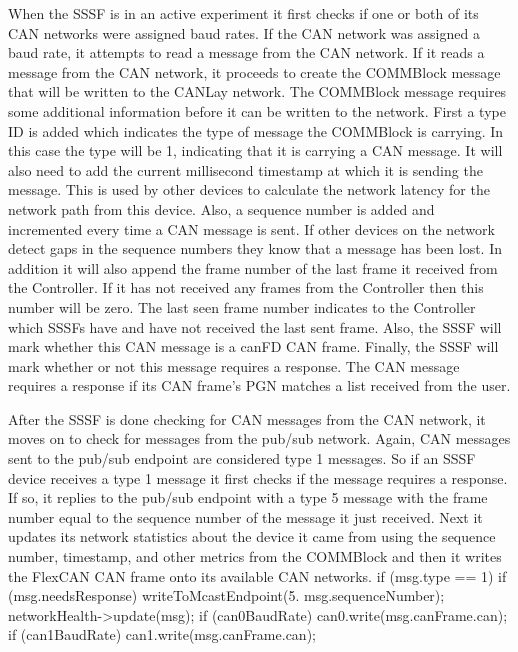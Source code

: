 \documentclass[letterpaper,twocolumn,12pt]{article}
\begin{document}
When the SSSF is in an active experiment it first checks if one or both of its CAN networks were assigned baud rates. If the CAN network was assigned a baud rate, it attempts to read a message from the CAN network. If it reads a message from the CAN network, it proceeds to create the COMMBlock message that will be written to the CANLay network. The COMMBlock message requires some additional information before it can be written to the network. First a type ID is added which indicates the type of message the COMMBlock is carrying. In this case the type will be 1, indicating that it is carrying a CAN message. It will also need to add the current millisecond timestamp at which it is sending the message. This is used by other devices to calculate the network latency for the network path from this device. Also, a sequence number is added and incremented every time a CAN message is sent. If other devices on the network detect gaps in the sequence numbers they know that a message has been lost. In addition it will also append the frame number of the last frame it received from the Controller. If it has not received any frames from the Controller then this number will be zero. The last seen frame number indicates to the Controller which SSSFs have and have not received the last sent frame. Also, the SSSF will mark whether this CAN message is a canFD CAN frame. Finally, the SSSF will mark whether or not this message requires a response. The CAN message requires a response if its CAN frame’s PGN matches a list received from the user.

After the SSSF is done checking for CAN messages from the CAN network, it moves on to check for messages from the pub/sub network. Again, CAN messages sent to the pub/sub endpoint are considered type 1 messages. So if an SSSF device receives a type 1 message it first checks if the message requires a response. If so, it replies to the pub/sub endpoint with a type 5 message with the frame number equal to the sequence number of the message it just received. Next it updates its network statistics about the device it came from using the sequence number, timestamp, and other metrics from the COMMBlock and then it writes the FlexCAN CAN frame onto its available CAN networks.
    if (msg.type == 1)
    {
        if (msg.needsResponse)
        {
            writeToMcastEndpoint(5. msg.sequenceNumber);
        }
        networkHealth->update(msg);
        if (can0BaudRate) can0.write(msg.canFrame.can);
        if (can1BaudRate) can1.write(msg.canFrame.can);
    }
\end{document}
